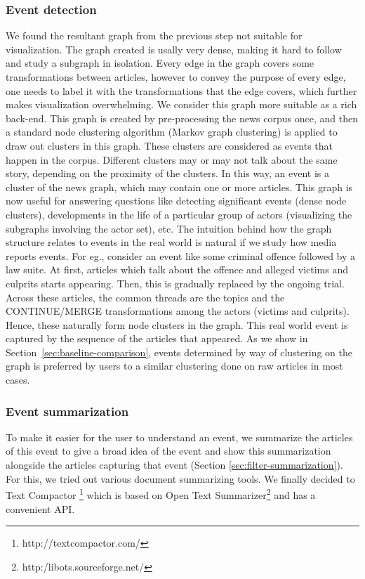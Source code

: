 \subsubsection*{Event detection}
We found the resultant graph from the previous step not suitable for visualization. The graph created is usally very dense, making it hard to follow and study a subgraph in isolation.
Every edge in the graph covers some transformations between articles, however to convey the purpose of every edge, one needs to label it with the transformations that the edge covers, 
which further makes visualization overwhelming. 
We consider this graph more suitable as a rich back-end.
This graph is created by pre-processing the news corpus once, and then a standard node clustering algorithm (Markov graph clustering) is applied to draw out clusters in this graph. 
These clusters are considered as events that happen in the corpus. Different clusters may or may not talk about the same story, depending on the proximity of the clusters.
In this way, an event is a cluster of the news graph, which may contain one or more articles. 
This graph is now useful for answering questions like detecting significant events (dense node clusters), developments in the life of a particular group of actors (visualizing the subgraphs 
involving the actor set), etc. The intuition behind how the graph structure relates to events in the real world is natural if we study how media reports events. 
For eg., consider an event like some criminal offence followed by a law suite. At first, articles which talk about the offence and alleged victims and culprits starts appearing. Then, this is gradually
replaced by the ongoing trial. Across these articles, the common threads are the topics and the CONTINUE/MERGE transformations among the actors (victims and culprits). Hence, these naturally form node clusters in the graph. This real world event is captured 
by the sequence of the articles that appeared.
As we show in Section~\ref{sec:baseline-comparison}, events determined by way of clustering on the graph is preferred by users to a similar clustering
done on raw articles in most cases.
\subsubsection*{Event summarization}
To make it easier for the user to understand an event, we summarize the articles of this event to give a broad idea of the event and show this summarization alongside the articles capturing that event (Section \ref{sec:filter-summarization}). For this, we tried out various document summarizing tools. We finally decided to Text Compactor \footnote{http://textcompactor.com/} which is based on Open Text Summarizer\footnote{http:/libots.sourceforge.net/} and has a convenient API. 
